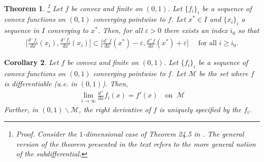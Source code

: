 \documentclass[11pt]{article}
\newtheorem{thm}{Theorem}[section]
\newtheorem{cor}[thm]{Corollary}
\newtheorem{prop}[thm]{Proposition}
\numberwithin{equation}{section}
\begin{document}
    
    \begin{thm} \!\!\!\! \footnote{\textit{Proof.} Consider the $1$-dimensional case of Theorem 24.5 in \cite{Rockafellar}. The general version of the theorem presented in the text refers to the more general notion of the \textit{subdifferential}.}
        Let $f$ be convex and finite on $(0,1)$. Let $\{f_i\}_i$ be a sequence of convex functions on $(0,1)$ converging pointwise to $f$. Let $x^*\in I$ and $\{x_i\}_i$ a sequence in $I$ converging to $x^*$. Then, for all $\varepsilon>0$ there exists an index $i_0$ so that 
        \begin{align*}
            \Big[\frac{d^- f_i}{dx}(x_i),\frac{d^+ f_i}{dx}(x_i)\Big] \subset \Big[\frac{d^- f}{dx}(x^*)-\varepsilon,\frac{d^+ f}{dx}(x^*)+\varepsilon\Big] \quad \text{ for all }i\geq i_0. 
        \end{align*}
    \end{thm}
    \begin{cor}\label{DerivSwap}
        Let $f$ be convex and finite on $(0,1)$. Let $\{f_i\}_i$ be a sequence of convex functions on $(0,1)$ converging pointwise to $f$. Let $\mathcal{M}$ be the set where $f$ is differentiable (a.e. in $(0,1)$). Then, 
        \begin{align*}
            \lim_{i\to\infty} \frac{d^+}{dx}f_i(x)=f'(x) \quad \text{on } \ \mathcal{M}
        \end{align*}    
        Further, in $(0,1)\backslash \mathcal{M}$, the right derivative of $f$ is uniquely specified by the $f_i$.
    \end{cor}
\end{document}
